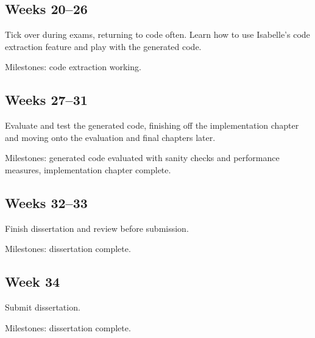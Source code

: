 \documentclass[12pt]{article}
\begin{document}
\subsection*{Weeks 20--26}
Tick over during exams, returning to code often. Learn how to use Isabelle's code extraction feature and play with the generated code.

Milestones: code extraction working.

\subsection*{Weeks 27--31}
Evaluate and test the generated code, finishing off the implementation chapter and moving onto the evaluation and final chapters later.

Milestones: generated code evaluated with sanity checks and performance measures, implementation chapter complete.

\subsection*{Weeks 32--33}
Finish dissertation and review before submission.

Milestones: dissertation complete.

\subsection*{Week 34}
Submit dissertation.

Milestones: dissertation complete.
\printbibliography
\end{document}
